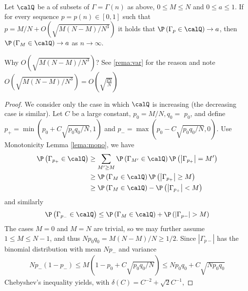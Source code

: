 \documentclass{article}
\begin{document}
\begin{thma}\label{thma:mono}
Let $\calQ$ be a  of subsets of $\Gamma=\Gamma(n)$ as above, $0 \leq M \leq N$ and $0 \leq a \leq 1$. If for every sequence $p=p(n) \in[0,1]$
such that $p=M / N+O\left(\sqrt{M(N-M) / N^{3}}\right)$ it holds that $\P \left(\Gamma_{p} \in \calQ \right) \rightarrow a$,
then $\P \left(\Gamma_{M} \in \calQ \right) \rightarrow a$ as $n \rightarrow \infty$.
\end{thma}
\begin{rema}
Why $O\left(\sqrt{M(N-M) / N^{3}}\right)$? See \cref{rema:var} for the reason and note $O\left(\sqrt{M(N-M) / N^{3}}\right)=O\left(\sqrt{\frac{pq}{N}}\right)$
\end{rema}
\begin{proof}
We consider only the case in which $\calQ$ is increasing (the decreasing case is similar). Let $C$ be a large constant, $p_{0}=M / N, q_{0}=$ $p_{0}$, and define $p_{+}=\min \left(p_{0}+C \sqrt{p_{0} q_{0} / N}, 1\right)$ and $p_{-}=\max \left(p_{0}-C \sqrt{p_{0} q_{0} / N}, 0\right) .$ Use {Monotonicity Lemma} \cref{lema:mono}, we have
\begin{align*}
\begin{aligned}
\P \left(\Gamma_{p_{+}} \in \calQ \right)  & \geq \sum_{M^{\prime} \geq M} \P \left(\Gamma_{M^{\prime}} \in \calQ \right) \P \left(\left|\Gamma_{p_{+}}\right|=M^{\prime}\right) \\
& \geq \P \left(\Gamma_{M} \in \calQ \right) \P \left(\left|\Gamma_{p_{+}}\right| \geq M\right) \\
& \geq \P \left(\Gamma_{M} \in \calQ \right)- \P \left(\left|\Gamma_{p_{+}}\right|<M\right)
\end{aligned}
\end{align*}
and similarly
\begin{align*}
\P \left(\Gamma_{p_{-}} \in \calQ \right) \leq \P \left(\Gamma_{M} \in \calQ \right)+ \P \left(\left|\Gamma_{p-}\right|>M\right)
\end{align*}
The cases $M=0$ and $M=N$ are trivial, so we may further assume $1 \leq M \leq N-1$, and thus $N p_{0} q_{0}=M(N-M) / N \geq 1 / 2 .$ Since $\left|\Gamma_{p-}\right|$ has the binomial distribution with mean $N p_{-}$ and variance
\begin{align*}
N p_{-}\left(1-p_{-}\right) \leq M\left(1-p_{0}+C \sqrt{p_{0} q_{0} / N}\right) \leq N p_{0} q_{0}+C \sqrt{N p_{0} q_{0}}
\end{align*}
Chebyshev's inequality yields, with $\delta(C)=C^{-2}+\sqrt{2} C^{-1}$,

\end{proof}
\end{document}
